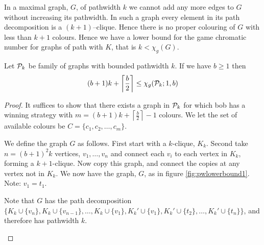 In a maximal graph, $G$, of pathwidth $k$ we cannot add any more edges to $G$ without increasing its pathwidth. In such a graph every element in its path decomposition is a $(k+1)$--clique. Hence there is no proper colouring of $G$ with less than $k+1$ colours. Hence we have a lower bound for the game chromatic number for graphs of path with $K$, that is $k < \chi_g(G) $. 

\begin{theorem}
    Let $\mathcal{P}_k$ be family of graphs with bounded pathwidth $k$. If we have $b\geq1$  then \[(b+1)k+\left\lceil \frac{b}{2}\right\rceil\leq\chi_g(\mathcal{P}_k;1,b)\]
\end{theorem}

\begin{proof}
    It suffices to show that there exists a graph in $\mathcal{P}_k$ for which bob has a winning strategy with $m=(b+1)k+\left\lceil\frac{b}{2}\right\rceil-1$ colours. We let the set of available colours be $C=\{c_1,c_2,\dots,c_m\}$.
    
    We define the graph $G$ as follows. First start with a $k$-clique, $K_k$. Second take $n=(b+1)^2k$ vertices, $v_1,\dots,v_n$ and connect each $v_i$ to each vertex in $K_k$, forming a $k+1$-clique. Now copy this graph,  and connect the copies at any vertex not in $K_k$. We now have the graph, $G$, as in figure \ref{fig:pwlowerbound1}. Note: $v_1=t_1$. 
    
    Note that $G$ has the path decomposition $\{K_k\cup\{v_n\}, K_k\cup\{v_{n-1}\}, \dots, K_k\cup\{v_1\}, K_k'\cup\{v_1\}, K_k'\cup\{t_2\}, \dots, K_k'\cup\{t_n\}\}$, and therefore has pathwidth $k$.
\begin{figure}[H]
    \centering
{}
\end{figure}
\end{proof}
